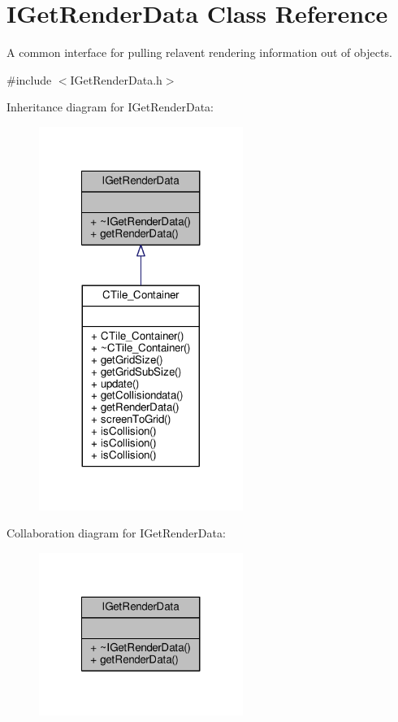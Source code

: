 \hypertarget{classIGetRenderData}{\section{I\-Get\-Render\-Data Class Reference}
\label{classIGetRenderData}
}


A common interface for pulling relavent rendering information out of objects.  




{\ttfamily \#include $<$I\-Get\-Render\-Data.\-h$>$}



Inheritance diagram for I\-Get\-Render\-Data\-:
\nopagebreak
\begin{figure}[H]
\begin{center}
\leavevmode
\includegraphics[width=188pt]{classIGetRenderData__inherit__graph}
\end{center}
\end{figure}


Collaboration diagram for I\-Get\-Render\-Data\-:\nopagebreak
\begin{figure}[H]
\begin{center}
\leavevmode
\includegraphics[width=188pt]{classIGetRenderData__coll__graph}
\end{center}
\end{figure}
